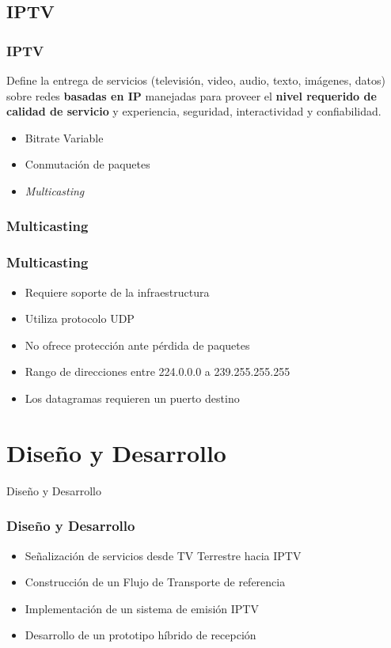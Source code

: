 \documentclass[a4paper,11pt]{beamer}
\begin{document}
	\subsection{IPTV}
		\begin{frame}
			\frametitle{IPTV}
			\begin{definition}
				Define la entrega de servicios (televisión, video, audio, texto, imágenes, datos) sobre redes \textbf{basadas en IP} manejadas para proveer el \textbf{nivel requerido de calidad de servicio} y experiencia, seguridad, interactividad y confiabilidad.
			\end{definition}
			\begin{itemize}
				\item Bitrate Variable
				\item Conmutación de paquetes
				\item \emph{Multicasting}
			\end{itemize}			
		\end{frame}

		
		\subsubsection{Multicasting}
		\begin{frame}
			\frametitle{Multicasting}
			\begin{itemize}
				\item Requiere soporte de la infraestructura
				\item Utiliza protocolo UDP
				\item No ofrece protección ante pérdida de paquetes
				\item Rango de direcciones entre 224.0.0.0 a 239.255.255.255
				\item Los datagramas requieren un puerto destino
			\end{itemize}
		\end{frame}

\section{Diseño y Desarrollo}
\begin{frame}

\begin{center}
\Huge Diseño y Desarrollo
\end{center}

\end{frame}
	\begin{frame}
		\frametitle{Diseño y Desarrollo}
		\begin{itemize}
			\item Señalización de servicios desde TV Terrestre hacia IPTV
			\item Construcción de un Flujo de Transporte de referencia
			\item Implementación de un sistema de emisión IPTV
			\item Desarrollo de un prototipo híbrido de recepción
		\end{itemize}
	\end{frame}
\end{document}
